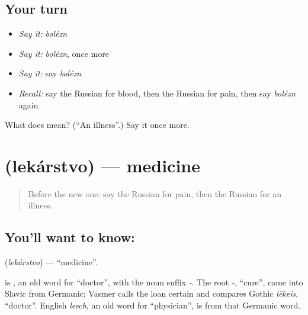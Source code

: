 \subsection*{Your turn}
\begin{itemize}
\raggedright
  \item \emph{Say it:} \emph{bolézn}
  \item \emph{Say it:} \emph{bolézn}, once more
  \item \emph{Say it:} say \emph{bolézn}
  \item \emph{Recall:} say the Russian for blood, then the Russian for pain, then say \emph{bolézn} again
\end{itemize}

\begin{tcolorbox}[breakable,colback=teal!4,colframe=teal!35!black,title={Before you move on}]
What does  mean? (\textquotedblleft{}An illness\textquotedblright{}.) Say it once more.
\end{tcolorbox}
\section[\texorpdfstring{\ru{лекарство} (lekárstvo)}{лекарство (lekárstvo)}]{ (lekárstvo) — medicine}

\label{lesson:RU-C32-medicine}



\begin{quote}
Before the new one: say the Russian for pain, then the Russian for an illness.
\end{quote}

\subsection*{You'll want to know: }
\textbf{} (\emph{lekárstvo}) — \textquotedblleft{}medicine\textquotedblright{}.

\begin{cousinweb}
\textbf{} is \emph{}, an old word for \textquotedblleft{}doctor\textquotedblright{}, with the noun suffix \emph{-}. The root \emph{-}, \textquotedblleft{}cure\textquotedblright{}, came into Slavic from Germanic; Vasmer calls the loan certain and compares Gothic \emph{lēkeis}, \textquotedblleft{}doctor\textquotedblright{}. English \emph{leech}, an old word for \textquotedblleft{}physician\textquotedblright{}, is from that Germanic word.
\end{cousinweb}

